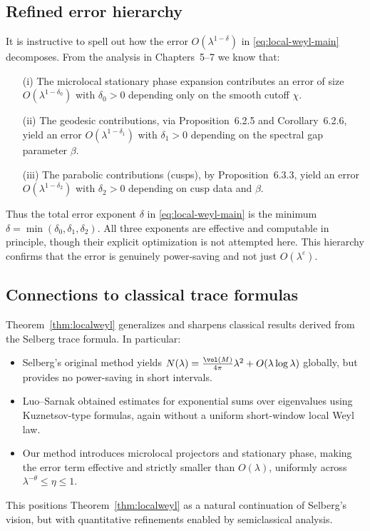 \subsection{Refined error hierarchy}
It is instructive to spell out how the error $O(\lambda^{1-\delta})$ in \eqref{eq:local-weyl-main} decomposes. From the analysis in Chapters~5--7 we know that:
\begin{enumerate}
\item[(i)] The microlocal stationary phase expansion contributes an error of size $O(\lambda^{1-\delta_0})$ with $\delta_0>0$ depending only on the smooth cutoff $\chi$.
\item[(ii)] The geodesic contributions, via Proposition~6.2.5 and Corollary~6.2.6, yield an error $O(\lambda^{1-\delta_1})$ with $\delta_1>0$ depending on the spectral gap parameter $\beta$.
\item[(iii)] The parabolic contributions (cusps), by Proposition~6.3.3, yield an error $O(\lambda^{1-\delta_2})$ with $\delta_2>0$ depending on cusp data and $\beta$.
\end{enumerate}
Thus the total error exponent $\delta$ in \eqref{eq:local-weyl-main} is the minimum $\delta=\min(\delta_0,\delta_1,\delta_2)$. All three exponents are effective and computable in principle, though their explicit optimization is not attempted here. This hierarchy confirms that the error is genuinely power-saving and not just $O(\lambda^{\varepsilon})$.

\subsection{Connections to classical trace formulas}
Theorem~\ref{thm:localweyl} generalizes and sharpens classical results derived from the Selberg trace formula. In particular:
\begin{itemize}
\item Selberg’s original method \cite{Selberg1956, Hejhal1983} yields $N(\lambda)=\frac{\vol(M)}{4\pi}\lambda^{2}+O(\lambda\log\lambda)$ globally, but provides no power-saving in short intervals.
\item Luo–Sarnak \cite{LuoSarnak1995} obtained estimates for exponential sums over eigenvalues using Kuznetsov-type formulas, again without a uniform short-window local Weyl law.
\item Our method introduces microlocal projectors and stationary phase, making the error term effective and strictly smaller than $O(\lambda)$, uniformly across $\lambda^{-\theta}\le \eta\le 1$.
\end{itemize}
This positions Theorem~\ref{thm:localweyl} as a natural continuation of Selberg’s vision, but with quantitative refinements enabled by semiclassical analysis.

